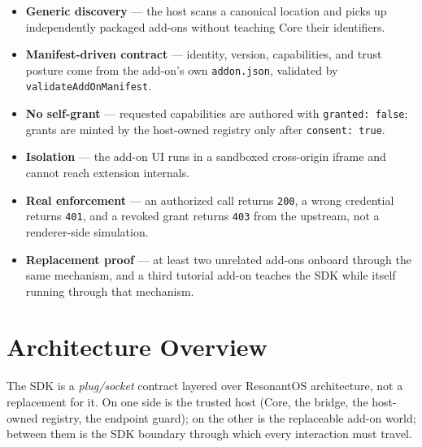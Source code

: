 \documentclass[11pt]{article}
\begin{document}
\begin{itemize}[leftmargin=1.5em]
  \item \textbf{Generic discovery} --- the host scans a canonical location and
        picks up independently packaged add-ons without teaching Core their
        identifiers.
  \item \textbf{Manifest-driven contract} --- identity, version, capabilities,
        and trust posture come from the add-on's own \texttt{addon.json},
        validated by \texttt{validateAddOnManifest}.
  \item \textbf{No self-grant} --- requested capabilities are authored with
        \texttt{granted: false}; grants are minted by the host-owned registry
        only after \texttt{consent: true}.
  \item \textbf{Isolation} --- the add-on UI runs in a sandboxed cross-origin
        iframe and cannot reach extension internals.
  \item \textbf{Real enforcement} --- an authorized call returns \texttt{200},
        a wrong credential returns \texttt{401}, and a revoked grant returns
        \texttt{403} from the upstream, not a renderer-side simulation.
  \item \textbf{Replacement proof} --- at least two unrelated add-ons onboard
        through the same mechanism, and a third tutorial add-on teaches the SDK
        while itself running through that mechanism.
\end{itemize}

\section{Architecture Overview}

The SDK is a \emph{plug/socket} contract layered over ResonantOS architecture,
not a replacement for it. On one side is the trusted host (Core, the bridge,
the host-owned registry, the endpoint guard); on the other is the replaceable
add-on world; between them is the SDK boundary through which every interaction
must travel.

\begin{center}
\end{center}
\end{document}
